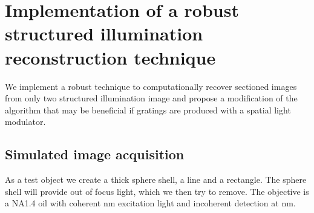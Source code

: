 

\newcommand{\avg}[1]{\langle #1 \rangle}

\chapter{Implementation of a robust structured illumination
  reconstruction technique}
\begin{summary}
  We implement a robust technique to computationally recover sectioned
  images from only two structured illumination image and propose a
  modification of the algorithm that may be beneficial if gratings are
  produced with a spatial light modulator.
\end{summary}
\section{Simulated image acquisition}
As a test object we create a thick sphere shell, a line and a
rectangle. The sphere shell will provide out of focus light, which we
then try to remove. The objective is a NA1.4 oil with coherent
\unit[473]{nm} excitation light and incoherent detection at
\unit[520]{nm}.

